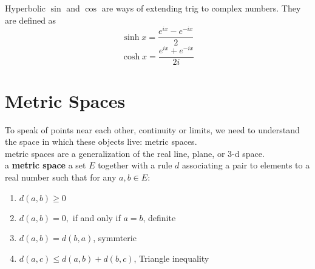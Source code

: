 \documentclass[12pt]{article}
\begin{document}
Hyperbolic $\sin$ and $\cos$ are ways of extending trig to complex numbers. They are defined as 
$$\sinh x = \frac{e^{ix} - e^{-ix}}{2}$$
$$\cosh x = \frac{e^{ix} + e^{-ix}}{2i}$$
\section*{Metric Spaces}

To speak of points near each other, continuity or limits, we need to understand the space in which these objects live: metric spaces. \\

metric spaces are a generalization of the real line, plane, or 3-d space. \\

\noindent a \textbf{metric space} a set $E$ together with a rule $d$ associating a pair to elements to a real number such that for any $a, b \in E$:

\begin{enumerate}
    \item $d(a, b) \geq 0$ 
    \item $d(a, b) = 0,$ if and only if $a = b$, definite 
    \item $d(a, b) = d(b, a)$, symmteric
    \item $d(a, c) \leq d(a, b) + d(b, c)$, Triangle inequality \\
\end{enumerate}
\end{document}
